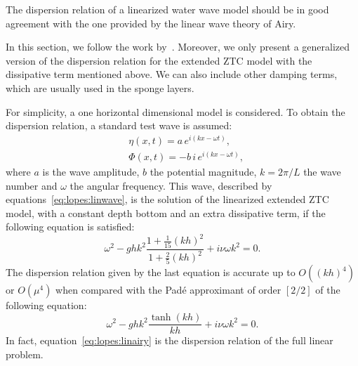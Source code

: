 The dispersion relation  of a linearized
water wave model should be in good agreement with the one provided by
the linear wave theory of Airy.

In this section, we follow the work by~\citet{DutykhDias2007}.
Moreover, we only present a generalized version of the dispersion
relation for the extended ZTC model with the dissipative term
mentioned above.  We can also include other damping terms, which are
usually used in the sponge layers.

For simplicity, a one horizontal dimensional model is considered.  To
obtain the dispersion relation, a standard test wave is assumed:
\begin{subequations}
  \label{eq:lopes:linwave}
  \begin{align}
    &\eta(x,t)=a\,e^{i(kx-\omega
      t)},\\
    &\Phi(x,t)=-b\,i\,e^{i(kx-\omega t)},
  \end{align}
\end{subequations}
where $a$ is the wave amplitude, $b$ the potential magnitude,
$k=2\pi/L$ the wave number and $\omega$ the angular frequency.  This
wave, described by equations~\eqref{eq:lopes:linwave}, is the solution
of the linearized extended ZTC model, with a constant depth bottom and
an extra dissipative term, if the following equation is satisfied:
\begin{equation}
  \label{eq:lopes:dissdisp}
  \omega^2-ghk^2\frac{1+\frac{1}{15}(kh)^2}{1 +
  \frac{2}{5}(kh)^2} + i\nu\omega k^2=0.
\end{equation}
The dispersion relation given by the last equation is accurate up to
$O((kh)^4)$ or $O(\mu^4)$ when compared with the Pad\'{e} approximant
of order $[2/2]$ of the following equation:
\begin{equation}
  \label{eq:lopes:linairy}
  \omega^2-ghk^2\frac{\tanh(kh)}{kh} + i\nu\omega k^2 = 0.
\end{equation}
In fact, equation~\eqref{eq:lopes:linairy} is the dispersion relation
of the full linear problem.

